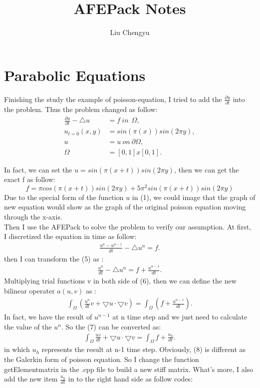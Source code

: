 \documentclass[12pt,openany]{article}
\title{AFEPack Notes}
\author{Liu Chengyu}
\begin{document}
\maketitle

\newpage
{}
\setcounter{page}{1}
\section*{Parabolic Equations}
Finishing the study the example of poisson-equation, I tried to add the $\frac{\partial u}{\partial t}$ into the problem. Thus the problem changed as follow:\\
\begin{align}
	\frac{\partial u}{\partial t}-\bigtriangleup u &= f\ in\   \  \Omega,\\
	u_{t=0}(x,y) &= sin(\pi(x))sin(2\pi y),\\
	u &= u\   on\   \partial \Omega,\\
	\Omega&=[0,1]x[0,1].
\end{align}

In fact, we can set the $u=sin(\pi(x+t))sin(2\pi y)$, then we can get the exact f as follow:
 $$f=\pi cos(\pi(x+t))sin(2\pi y)+5\pi^{2}sin(\pi(x+t))sin(2\pi y)$$
Due to the special form of the function $u$ in (1), we could image that the graph of new equation would show as the graph of the original poisson equation moving through the x-axis.\\
 Then I use the AFEPack to solve the problem to verify our assumption. At first, I discretized the equation in time as follow:
\begin{align}
	\frac{u^{n}-u^{n-1}}{dt} - \bigtriangleup u^{n} = f .
\end{align}
then I can transform the (5) as :
\begin{align}
	\frac{u^{n}}{dt}-\bigtriangleup u^{n} = f + \frac{u^{n-1}}{dt}.
\end{align}
Multiplying trial functions v in both side of (6), then we can define the new bilinear operater $a(u,v)$ as :
\begin{align}
	\int_{\Omega}(\frac{u^{n}}{dt}v+\bigtriangledown u\cdot\bigtriangledown v) = \int_{\Omega}(f+\frac{u^{n-1}}{dt}).
\end{align}
In fact, we have the result of $u^{n-1}$ at n time step and we just need to calculate the value of the $u^{n}$. So the (7) can be converted as:
\begin{align}
	\int_{\Omega}\frac{uv}{dt}+\bigtriangledown u\cdot\bigtriangledown v = \int_{\Omega}f+\frac{u_{h}}{dt}.
\end{align}
in which $u_h$ represents the result at n-1 time step. Obviously, (8) is different as the Galerkin form of poisson equation. So I change the function getElementmatrix in the .cpp file to build a new stiff matrix. What's more, I also add the new item $\frac{u_{h}}{dt}$ in to the right hand side as follow codes:
\end{document}
